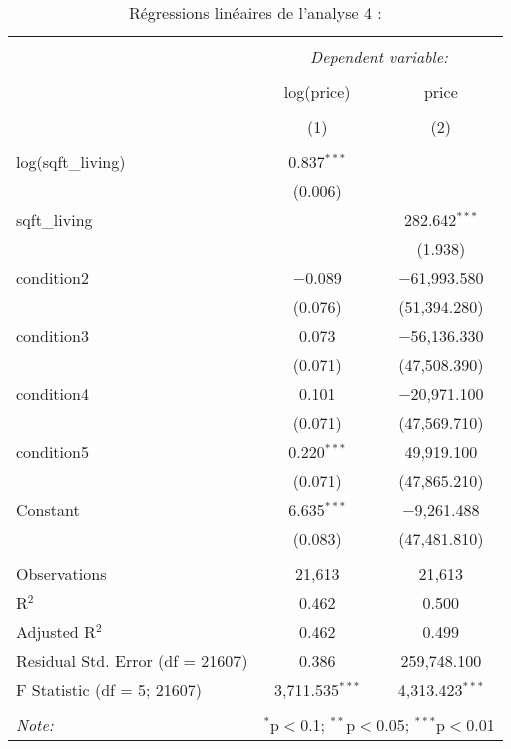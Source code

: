 \documentclass[
  11pt,
  french,
]{article}
\begin{document}
\begin{table}[!htbp] \centering 
  \caption{Régressions linéaires de l'analyse 4 :} 
  \label{} 
\small 
\begin{tabular}{@{\extracolsep{1pt}}lcc} 
\\[-1.8ex]\hline 
\hline \\[-1.8ex] 
 & \multicolumn{2}{c}{\textit{Dependent variable:}} \\ 
\cline{2-3} 
\\[-1.8ex] & log(price) & price \\ 
\\[-1.8ex] & (1) & (2)\\ 
\hline \\[-1.8ex] 
 log(sqft\_living) & 0.837$^{***}$ &  \\ 
  & (0.006) &  \\ 
  sqft\_living &  & 282.642$^{***}$ \\ 
  &  & (1.938) \\ 
  condition2 & $-$0.089 & $-$61,993.580 \\ 
  & (0.076) & (51,394.280) \\ 
  condition3 & 0.073 & $-$56,136.330 \\ 
  & (0.071) & (47,508.390) \\ 
  condition4 & 0.101 & $-$20,971.100 \\ 
  & (0.071) & (47,569.710) \\ 
  condition5 & 0.220$^{***}$ & 49,919.100 \\ 
  & (0.071) & (47,865.210) \\ 
  Constant & 6.635$^{***}$ & $-$9,261.488 \\ 
  & (0.083) & (47,481.810) \\ 
 \hline \\[-1.8ex] 
Observations & 21,613 & 21,613 \\ 
R$^{2}$ & 0.462 & 0.500 \\ 
Adjusted R$^{2}$ & 0.462 & 0.499 \\ 
Residual Std. Error (df = 21607) & 0.386 & 259,748.100 \\ 
F Statistic (df = 5; 21607) & 3,711.535$^{***}$ & 4,313.423$^{***}$ \\ 
\hline 
\hline \\[-1.8ex] 
\textit{Note:}  & \multicolumn{2}{r}{$^{*}$p$<$0.1; $^{**}$p$<$0.05; $^{***}$p$<$0.01} \\ 
\end{tabular} 
\end{table}
\end{document}
